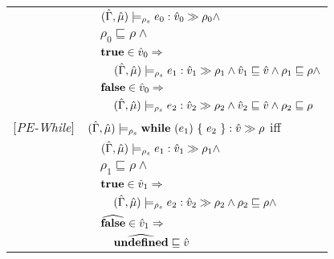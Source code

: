 \begin{tabular}{l l l l}
&&\multicolumn{2}{l}{$(\hat{\Gamma},\hat{\mu}) \models_{\rho_s} e_0 : \hat{v}_{0} \gg \rho_{0} \wedge$}\\
&&\multicolumn{2}{l}{$\rho_0 \sqsubseteq \rho \wedge$} \\
&&\multicolumn{2}{l}{$\mathbf{\mathbf{true}} \in \hat{v}_0 \Rightarrow$}\\
&&&$(\hat{\Gamma},\hat{\mu}) \models_{\rho_s} e_1 : \hat{v}_{1} \gg \rho_{1} \wedge \hat{v}_1 \sqsubseteq \hat{v} \wedge \rho_1 \sqsubseteq \rho \wedge$ \\
&&\multicolumn{2}{l}{$\mathbf{\mathbf{false}} \in \hat{v}_0 \Rightarrow$}\\
&&&$(\hat{\Gamma},\hat{\mu}) \models_{\rho_s} e_2 : \hat{v}_{2} \gg \rho_{2} \wedge \hat{v}_2 \sqsubseteq \hat{v} \wedge \rho_2 \sqsubseteq \rho$ \\
{[\textit{PE-While}]}&\multicolumn{3}{l}{$(\hat{\Gamma},\hat{\mu}) \models_{\rho_s} \mathbf{while}\ (e_1)\ \{\ e_2\ \} : \hat{v} \gg \rho $ iff}\\
&&\multicolumn{2}{l}{$(\hat{\Gamma},\hat{\mu}) \models_{\rho_s} e_1 : \hat{v}_{1} \gg \rho_{1} \wedge $}\\
&&\multicolumn{2}{l}{$\rho_1 \sqsubseteq \rho \wedge$} \\
&&\multicolumn{2}{l}{$\mathbf{\mathbf{true}} \in \hat{v}_1 \Rightarrow$}\\
&&&$(\hat{\Gamma},\hat{\mu}) \models_{\rho_s} e_2 : \hat{v}_{2} \gg \rho_{2} \wedge \rho_2 \sqsubseteq \rho \wedge$\\ %
&&\multicolumn{2}{l}{$\widehat{\mathbf{false}} \in \hat{v}_1 \Rightarrow$}\\
&&&$\widehat{\mathbf{undefined}} \sqsubseteq \hat{v}$\\
\end{tabular}\newpage
